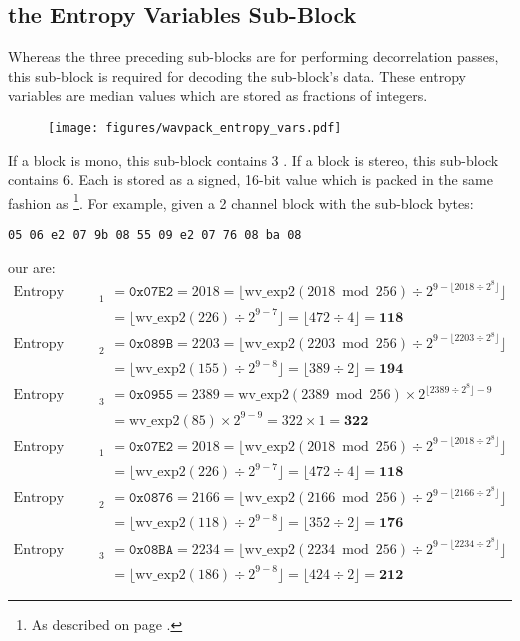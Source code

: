 \clearpage

\subsection{the Entropy Variables Sub-Block}
Whereas the three preceding sub-blocks are for performing
decorrelation passes, this sub-block is required for
decoding the  sub-block's data.
These entropy variables are median values which are stored
as fractions of integers.
\begin{figure}[h]
\texttt{[image: figures/wavpack\_entropy\_vars.pdf]}
\end{figure}
\par
\noindent
If a block is mono, this sub-block contains 3 .
If a block is stereo, this sub-block contains 6.
Each is stored as a signed, 16-bit value which is packed in
the same fashion as \footnote{As described
on page \pageref{wavpack_decorr_samples}.}.
For example, given a 2 channel block with the sub-block bytes:
\begin{Verbatim}[frame=single]
05 06 e2 07 9b 08 55 09 e2 07 76 08 ba 08
\end{Verbatim}
our  are:
\begin{align*}
\text{Entropy Variable A}_1 &= \texttt{0x07E2} = 2018 = \lfloor \text{wv\_exp2}(2018 \bmod{256}) \div 2 ^ {9 - \lfloor 2018 \div 2 ^ 8 \rfloor} \rfloor \\
&= \lfloor \text{wv\_exp2}(226) \div 2 ^ {9 - 7} \rfloor
 = \lfloor 472 \div 4 \rfloor = \textbf{118} \\
\text{Entropy Variable A}_2 &= \texttt{0x089B} = 2203 = \lfloor \text{wv\_exp2}(2203 \bmod{256}) \div 2 ^ {9 - \lfloor 2203 \div 2 ^ 8 \rfloor} \rfloor \\
&= \lfloor \text{wv\_exp2}(155) \div 2 ^ {9 - 8} \rfloor
 = \lfloor 389 \div 2 \rfloor = \textbf{194} \\
\text{Entropy Variable A}_3 &= \texttt{0x0955} = 2389 = \text{wv\_exp2}(2389 \bmod{256}) \times 2 ^ {\lfloor 2389 \div 2 ^ 8 \rfloor - 9} \\
&= \text{wv\_exp2}(85) \times 2 ^ {9 - 9} = 322 \times 1 = \textbf{322} \\
\text{Entropy Variable B}_1 &= \texttt{0x07E2} = 2018 = \lfloor \text{wv\_exp2}(2018 \bmod{256}) \div 2 ^ {9 - \lfloor 2018 \div 2 ^ 8 \rfloor} \rfloor \\
&= \lfloor \text{wv\_exp2}(226) \div 2 ^ {9 - 7} \rfloor
 = \lfloor 472 \div 4 \rfloor = \textbf{118} \\
\text{Entropy Variable B}_2 &= \texttt{0x0876} = 2166 = \lfloor \text{wv\_exp2}(2166 \bmod{256}) \div 2 ^ {9 - \lfloor 2166 \div 2 ^ 8 \rfloor} \rfloor \\
&= \lfloor \text{wv\_exp2}(118) \div 2 ^ {9 - 8} \rfloor = \lfloor 352 \div 2 \rfloor = \textbf{176} \\
\text{Entropy Variable B}_3 &= \texttt{0x08BA} = 2234 = \lfloor \text{wv\_exp2}(2234 \bmod{256}) \div 2 ^ {9 - \lfloor 2234 \div 2 ^ 8 \rfloor} \rfloor \\
&= \lfloor \text{wv\_exp2}(186) \div 2 ^ {9 - 8} \rfloor
 = \lfloor 424 \div 2 \rfloor = \textbf{212}
\end{align*}


